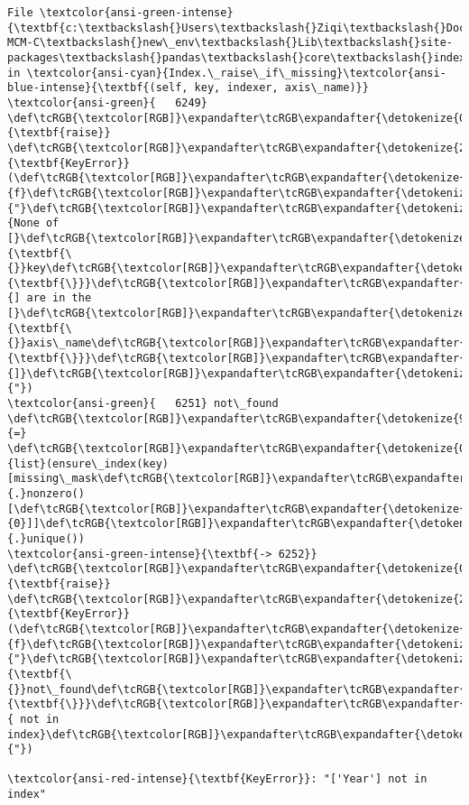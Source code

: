 \documentclass[11pt]{article}
\begin{document}
\begin{Verbatim}[commandchars=\\\{\}, frame=single, framerule=2mm, rulecolor=\color{outerrorbackground}]
File \textcolor{ansi-green-intense}{\textbf{c:\textbackslash{}Users\textbackslash{}Ziqi\textbackslash{}Documents\textbackslash{}Python\textbackslash{}2025-MCM-C\textbackslash{}new\_env\textbackslash{}Lib\textbackslash{}site-packages\textbackslash{}pandas\textbackslash{}core\textbackslash{}indexes\textbackslash{}base.py:6252}}, in \textcolor{ansi-cyan}{Index.\_raise\_if\_missing}\textcolor{ansi-blue-intense}{\textbf{(self, key, indexer, axis\_name)}}
\textcolor{ansi-green}{   6249}     \def\tcRGB{\textcolor[RGB]}\expandafter\tcRGB\expandafter{\detokenize{0,135,0}}{\textbf{raise}} \def\tcRGB{\textcolor[RGB]}\expandafter\tcRGB\expandafter{\detokenize{215,95,95}}{\textbf{KeyError}}(\def\tcRGB{\textcolor[RGB]}\expandafter\tcRGB\expandafter{\detokenize{175,0,0}}{f}\def\tcRGB{\textcolor[RGB]}\expandafter\tcRGB\expandafter{\detokenize{175,0,0}}{"}\def\tcRGB{\textcolor[RGB]}\expandafter\tcRGB\expandafter{\detokenize{175,0,0}}{None of [}\def\tcRGB{\textcolor[RGB]}\expandafter\tcRGB\expandafter{\detokenize{175,95,135}}{\textbf{\{}}key\def\tcRGB{\textcolor[RGB]}\expandafter\tcRGB\expandafter{\detokenize{175,95,135}}{\textbf{\}}}\def\tcRGB{\textcolor[RGB]}\expandafter\tcRGB\expandafter{\detokenize{175,0,0}}{] are in the [}\def\tcRGB{\textcolor[RGB]}\expandafter\tcRGB\expandafter{\detokenize{175,95,135}}{\textbf{\{}}axis\_name\def\tcRGB{\textcolor[RGB]}\expandafter\tcRGB\expandafter{\detokenize{175,95,135}}{\textbf{\}}}\def\tcRGB{\textcolor[RGB]}\expandafter\tcRGB\expandafter{\detokenize{175,0,0}}{]}\def\tcRGB{\textcolor[RGB]}\expandafter\tcRGB\expandafter{\detokenize{175,0,0}}{"})
\textcolor{ansi-green}{   6251} not\_found \def\tcRGB{\textcolor[RGB]}\expandafter\tcRGB\expandafter{\detokenize{98,98,98}}{=} \def\tcRGB{\textcolor[RGB]}\expandafter\tcRGB\expandafter{\detokenize{0,135,0}}{list}(ensure\_index(key)[missing\_mask\def\tcRGB{\textcolor[RGB]}\expandafter\tcRGB\expandafter{\detokenize{98,98,98}}{.}nonzero()[\def\tcRGB{\textcolor[RGB]}\expandafter\tcRGB\expandafter{\detokenize{98,98,98}}{0}]]\def\tcRGB{\textcolor[RGB]}\expandafter\tcRGB\expandafter{\detokenize{98,98,98}}{.}unique())
\textcolor{ansi-green-intense}{\textbf{-> 6252}} \def\tcRGB{\textcolor[RGB]}\expandafter\tcRGB\expandafter{\detokenize{0,135,0}}{\textbf{raise}} \def\tcRGB{\textcolor[RGB]}\expandafter\tcRGB\expandafter{\detokenize{215,95,95}}{\textbf{KeyError}}(\def\tcRGB{\textcolor[RGB]}\expandafter\tcRGB\expandafter{\detokenize{175,0,0}}{f}\def\tcRGB{\textcolor[RGB]}\expandafter\tcRGB\expandafter{\detokenize{175,0,0}}{"}\def\tcRGB{\textcolor[RGB]}\expandafter\tcRGB\expandafter{\detokenize{175,95,135}}{\textbf{\{}}not\_found\def\tcRGB{\textcolor[RGB]}\expandafter\tcRGB\expandafter{\detokenize{175,95,135}}{\textbf{\}}}\def\tcRGB{\textcolor[RGB]}\expandafter\tcRGB\expandafter{\detokenize{175,0,0}}{ not in index}\def\tcRGB{\textcolor[RGB]}\expandafter\tcRGB\expandafter{\detokenize{175,0,0}}{"})

\textcolor{ansi-red-intense}{\textbf{KeyError}}: "['Year'] not in index"
    \end{Verbatim}
\end{document}
